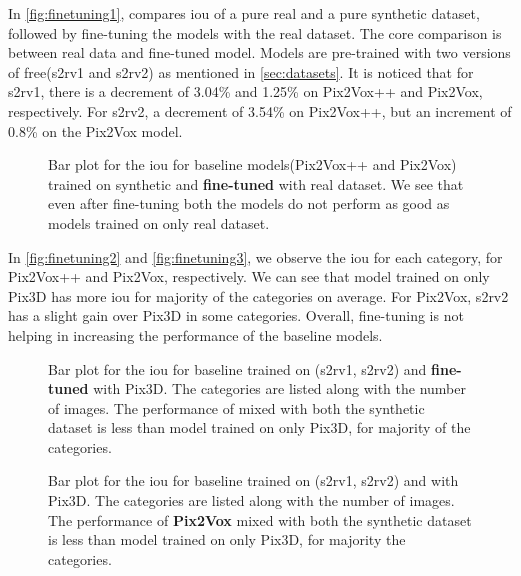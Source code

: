 In \autoref{fig:finetuning1}, compares \gls{iou} of a pure real and a pure synthetic dataset, followed by fine-tuning the models with the real dataset.
The core comparison is between real data and fine-tuned model.
Models are pre-trained with two versions of \gls{free}(\gls{s2rv1} and \gls{s2rv2}) as mentioned in \autoref{sec:datasets}.
It is noticed that for \gls{s2rv1}, there is a decrement of 3.04\% and 1.25\% on Pix2Vox++ and Pix2Vox, respectively.
For \gls{s2rv2}, a decrement of 3.54\% on Pix2Vox++, but an increment of 0.8\% on the Pix2Vox model.

\begin{figure}[ht]
    \centering
    \resizebox{0.75\textwidth}{!}{}
    \caption{Bar plot for the \gls{iou} for baseline models(Pix2Vox++ and Pix2Vox) trained on synthetic and \textbf{fine-tuned} with real dataset.
    We see that even after fine-tuning both the models do not perform as good as models trained on only real dataset.}
    \label{fig:finetuning1}
\end{figure}

In \autoref{fig:finetuning2} and \autoref{fig:finetuning3}, we observe the \gls{iou} for each category, for Pix2Vox++ and Pix2Vox, respectively.
We can see that model trained on only Pix3D has more \gls{iou} for majority of the categories on average.
For Pix2Vox, \gls{s2rv2} has a slight gain over Pix3D in some categories.
Overall, fine-tuning is not helping in increasing the performance of the baseline models.


\begin{figure}[!ht]
    \centering
    \resizebox{0.65\textwidth}{!}{}
    \caption{Bar plot for the \gls{iou} for baseline  trained on (\gls{s2rv1}, \gls{s2rv2}) and \textbf{fine-tuned} with Pix3D.
    The categories are listed along with the number of images.
    The performance of  mixed with both the synthetic dataset is less than model trained on only Pix3D, for majority of the categories.}
    \label{fig:finetuning2}
\end{figure}

\begin{figure}[!ht]
    \centering
    \resizebox{0.65\textwidth}{!}{}
    \caption{Bar plot for the \gls{iou} for baseline  trained on (\gls{s2rv1}, \gls{s2rv2}) and  with Pix3D.
    The categories are listed along with the number of images.
    The performance of \textbf{Pix2Vox} mixed with both the synthetic dataset is less than model trained on only Pix3D, for majority the categories.}
    \label{fig:finetuning3}
\end{figure}

